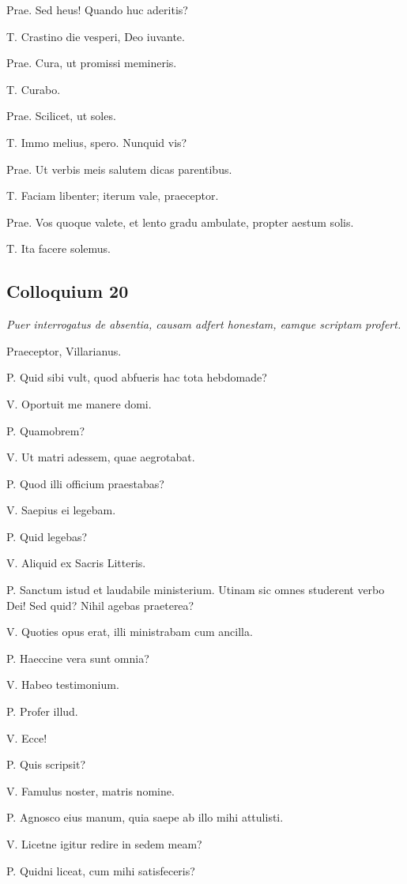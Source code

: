 \documentclass{article}
\begin{document}
Prae. Sed heus! Quando huc aderitis?

T. Crastino die vesperi, Deo iuvante.

Prae. Cura, ut promissi memineris.

T. Curabo.

Prae. Scilicet, ut soles.

T. Immo melius, spero. Nunquid vis?

Prae. Ut verbis meis salutem dicas parentibus.

T. Faciam libenter; iterum vale, praeceptor.

Prae. Vos quoque valete, et lento gradu ambulate, propter aestum solis.

T. Ita facere solemus.

\subsection{Colloquium 20}
\emph{Puer interrogatus de absentia, causam adfert honestam, eamque scriptam profert.}

Praeceptor, Villarianus.

P. Quid sibi vult, quod abfueris hac tota hebdomade?

V. Oportuit me manere domi.

P. Quamobrem?

V. Ut matri adessem, quae aegrotabat.

P. Quod illi officium praestabas?

V. Saepius ei legebam.

P. Quid legebas?

V. Aliquid ex Sacris Litteris.

P. Sanctum istud et laudabile ministerium. Utinam sic omnes studerent verbo Dei! Sed quid? Nihil agebas praeterea?

V. Quoties opus erat, illi ministrabam cum ancilla.

P. Haeccine vera sunt omnia?

V. Habeo testimonium.

P. Profer illud.

V. Ecce!

P. Quis scripsit?

V. Famulus noster, matris nomine.

P. Agnosco eius manum, quia saepe ab illo mihi attulisti.

V. Licetne igitur redire in sedem meam?

P. Quidni liceat, cum mihi satisfeceris?
\end{document}
